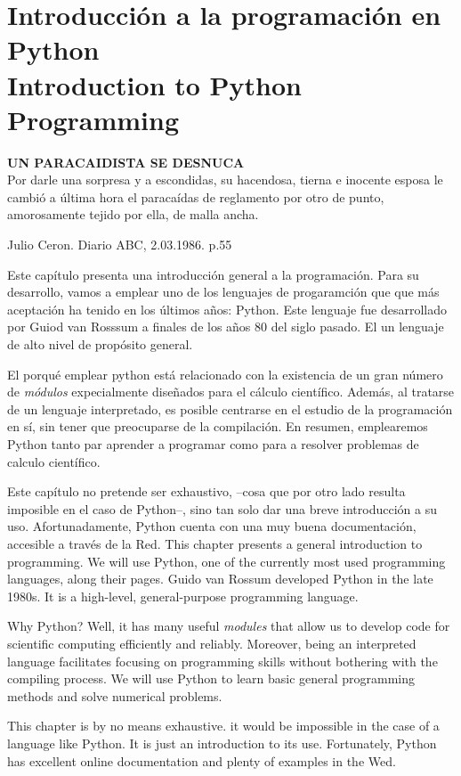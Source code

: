 \chapter[Intro a Python \textsection \textsection \ Intro to python]{Introducción a la programación en Python\\ Introduction to Python Programming}  
\epigraph{\textbf{UN PARACAIDISTA SE DESNUCA}\\ Por darle una sorpresa y a escondidas, su hacendosa, tierna e inocente esposa le cambió a última hora el paracaídas de reglamento por otro de punto, amorosamente tejido por ella, de malla ancha.}{Julio Ceron. Diario ABC, 2.03.1986. p.55}
\begin{paracol}{2}
Este capítulo presenta una introducción general a la programación. Para su desarrollo, vamos a emplear uno de los lenguajes de progaramción que  que más aceptación ha tenido en los últimos años: Python. Este lenguaje fue desarrollado por Guiod van Rosssum a finales de los años 80 del siglo pasado. El un lenguaje de alto nivel de propósito general.

El porqué emplear python está relacionado con la existencia de un gran número de \emph{módulos} expecialmente diseñados para el cálculo científico. Además, al tratarse de un lenguaje interpretado, es posible centrarse en el estudio de la programación en sí, sin tener que preocuparse de la compilación. En resumen, emplearemos Python tanto par aprender a programar como para a resolver problemas de calculo científico.

Este capítulo no pretende ser exhaustivo, --cosa que por otro lado resulta imposible en el caso de Python--, sino tan solo dar una breve introducción a su uso. Afortunadamente, Python cuenta con una muy buena documentación, accesible a través de la Red. 
\switchcolumn 
This chapter presents a general introduction to programming. We will use Python, one of the currently most used programming languages, along their pages. Guido van Rossum developed Python in the late 1980s. It is a high-level, general-purpose programming language. 

Why Python? Well, it has many useful \emph{modules} that allow us to develop code for scientific computing efficiently and reliably. Moreover, being an interpreted language facilitates focusing on programming skills without bothering with the compiling process. We will use Python to learn basic general programming methods and solve numerical problems.

This chapter is by no means exhaustive. it would be impossible in the case of a language like Python. It is just an introduction to its use. Fortunately, Python has excellent online documentation and plenty of examples in the Wed. 
\end{paracol}


